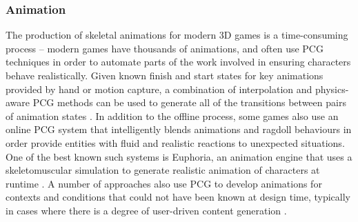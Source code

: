 \documentclass{acm_proc_article-sp}
\begin{document}
\subsubsection{Animation}
The production of skeletal animations for modern 3D games is a time-consuming process -- modern games have thousands of animations, and often use PCG techniques in order to automate parts of the work involved in ensuring characters behave realistically. Given known finish and start states for key animations provided by hand or motion capture, a combination of interpolation and physics-aware PCG methods can be used to generate all of the transitions between pairs of animation states \cite{ac3}.
In addition to the offline process, some games also use an online PCG system that intelligently blends animations and ragdoll behaviours in order provide entities with fluid and realistic reactions to unexpected situations. One of the best known such systems is Euphoria, an animation engine that uses a skeletomuscular simulation to generate realistic animation of characters at runtime \cite{motion2006euphoria}.
A number of approaches also use PCG to develop animations for contexts and conditions that could not have been known at design time, typically in cases where there is a degree of user-driven content generation \cite{horswill2009lightweight,Perlin:2008:FVP:1401843.1401854}.
\end{document}
